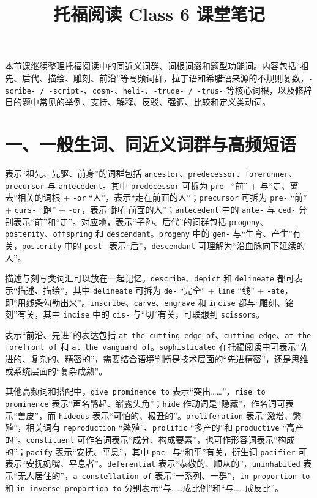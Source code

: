 \documentclass[UTF8,zihao=-4]{ctexart}
\title{\heiti 托福阅读 Class 6 课堂笔记}
\author{}
\date{}
\begin{document}
\maketitle
\thispagestyle{fancy}

本节课继续整理托福阅读中的同近义词群、词根词缀和题型功能词。内容包括“祖先、后代、描绘、雕刻、前沿”等高频词群，拉丁语和希腊语来源的不规则复数，\texttt{-scribe- / -script-}、\texttt{cosm-}、\texttt{heli-}、\texttt{-trude- / -trus-} 等核心词根，以及修辞目的题中常见的举例、支持、解释、反驳、强调、比较和定义类动词。

\section*{一、一般生词、同近义词群与高频短语}

表示“祖先、先驱、前身”的词群包括 \texttt{ancestor}、\texttt{predecessor}、\texttt{forerunner}、\texttt{precursor} 与 \texttt{antecedent}。其中 \texttt{predecessor} 可拆为 \texttt{pre-} “前” + 与“走、离去”相关的词根 + \texttt{-or} “人”，表示“走在前面的人”；\texttt{precursor} 可拆为 \texttt{pre-} “前” + \texttt{curs-} “跑” + \texttt{-or}，表示“跑在前面的人”；\texttt{antecedent} 中的 \texttt{ante-} 与 \texttt{ced-} 分别表示“前”和“走”。对应地，表示“子孙、后代”的词群包括 \texttt{progeny}、\texttt{posterity}、\texttt{offspring} 和 \texttt{descendant}。\texttt{progeny} 中的 \texttt{gen-} 与“生育、产生”有关，\texttt{posterity} 中的 \texttt{post-} 表示“后”，\texttt{descendant} 可理解为“沿血脉向下延续的人”。

描述与刻写类词汇可以放在一起记忆。\texttt{describe}、\texttt{depict} 和 \texttt{delineate} 都可表示“描述、描绘”，其中 \texttt{delineate} 可拆为 \texttt{de-} “完全” + \texttt{line} “线” + \texttt{-ate}，即“用线条勾勒出来”。\texttt{inscribe}、\texttt{carve}、\texttt{engrave} 和 \texttt{incise} 都与“雕刻、铭刻”有关，其中 \texttt{incise} 中的 \texttt{cis-} 与“切”有关，可联想到 \texttt{scissors}。

表示“前沿、先进”的表达包括 \texttt{at the cutting edge of}、\texttt{cutting-edge}、\texttt{at the forefront of} 和 \texttt{at the vanguard of}。\texttt{sophisticated} 在托福阅读中可表示“先进的、复杂的、精密的”，需要结合语境判断是技术层面的“先进精密”，还是思维或系统层面的“复杂成熟”。

其他高频词和搭配中，\texttt{give prominence to} 表示“突出……”，\texttt{rise to prominence} 表示“声名鹊起、崭露头角”；\texttt{hide} 作动词是“隐藏”，作名词可表示“兽皮”，而 \texttt{hideous} 表示“可怕的、极丑的”。\texttt{proliferation} 表示“激增、繁殖”，相关词有 \texttt{reproduction} “繁殖”、\texttt{prolific} “多产的”和 \texttt{productive} “高产的”。\texttt{constituent} 可作名词表示“成分、构成要素”，也可作形容词表示“构成的”；\texttt{pacify} 表示“安抚、平息”，其中 \texttt{pac-} 与“和平”有关，衍生词 \texttt{pacifier} 可表示“安抚奶嘴、平息者”。\texttt{deferential} 表示“恭敬的、顺从的”，\texttt{uninhabited} 表示“无人居住的”，\texttt{a constellation of} 表示“一系列、一群”，\texttt{in proportion to} 和 \texttt{in inverse proportion to} 分别表示“与……成比例”和“与……成反比”。
\end{document}
